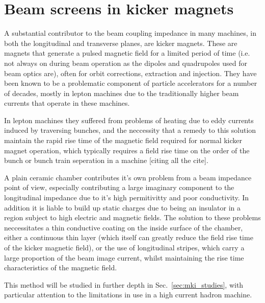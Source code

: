 \section{Beam screens in kicker magnets}
\label{sec:beam_screens}

A substantial contributor to the beam coupling impedance in many machines, in both the longitudinal and transverse planes, are kicker magnets. These are magnets that generate a pulsed magnetic field for a limited period of time (i.e. not always on during beam operation as the dipoles and quadrupoles used for beam optics are), often for orbit corrections, extraction and injection. They have been known to be a problematic component of particle accelerators for a number of decades, mostly in lepton machines due to the traditionally higher beam currents that operate in these machines.

In lepton machines they suffered from problems of heating due to eddy currents induced by traversing bunches, and the neccessity that a remedy to this solution maintain the rapid rise time of the magnetic field required for normal kicker magnet operation, which typically requires a field rise time on the order of the bunch or bunch train seperation in a machine [citing all the cite]. 

A plain ceramic chamber contributes it's own problem from a beam impedance point of view, especially contributing a large imaginary component to the longitudinal impedance due to it's high permitivitty and poor conductivity. In addition it is liable to build up static charges due to being an insulator in a region subject to high electric and magnetic fields. The solution to these problems neccessitates a thin conductive coating on the inside surface of the chamber, either a continuous thin layer (which itself can greatly reduce the field rise time of the kicker magnetic field), or the use of longitudinal stripes, which carry a large proportion of the beam image current, whilst maintaining the rise time characteristics of the magnetic field.

This method will be studied in further depth in Sec.~\ref{sec:mki_studies}, with particular attention to the limitations in use in a high current hadron machine.
